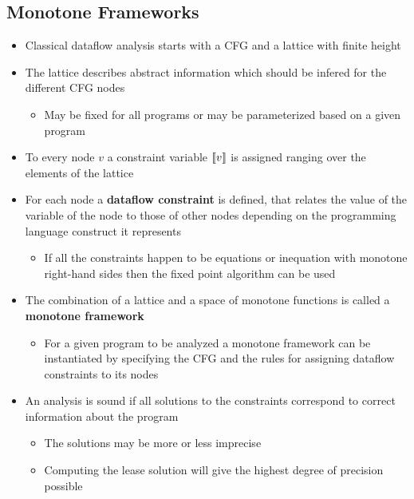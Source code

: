 \subsection{Monotone Frameworks}
\begin{itemize}
  \item Classical dataflow analysis starts with a CFG and a lattice with finite height
	\item The lattice describes abstract information which should be infered for the different CFG nodes
  \begin{itemize}
   	\item May be fixed for all programs or may be parameterized based on a given program
  \end{itemize}
	\item To every node $v$ a constraint variable $\left\llbracket v\right\rrbracket$ is assigned ranging over the elements of the lattice
	\item For each node a \textbf{dataflow constraint} is defined, that relates the value of the variable of the node to those of other nodes depending on the programming language construct it represents
  \begin{itemize}
  	\item If all the constraints happen to be equations or inequation with monotone right-hand sides then the fixed point algorithm can be used
  \end{itemize}
  \item The combination of a lattice and a space of monotone functions is called a \textbf{monotone framework} 
  \begin{itemize}
  	\item For a given program to be analyzed a monotone framework can be instantiated by specifying the CFG and the rules for assigning dataflow constraints to its nodes
  \end{itemize}
  \item An analysis is sound if all solutions to the constraints correspond to correct information about the program
  \begin{itemize}
    \item The solutions may be more or less imprecise
    \item Computing the lease solution will give the highest degree of precision possible
  \end{itemize}
\end{itemize}

